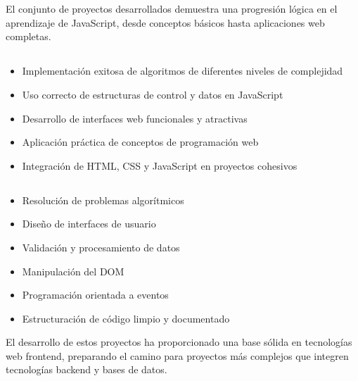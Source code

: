 \documentclass[10pt,a4paper]{article}
\begin{document}
\pagebreak

\section{\color{colorIPN}{Conclusiones Generales}}
El conjunto de proyectos desarrollados demuestra una progresión lógica en el aprendizaje de JavaScript, desde conceptos básicos hasta aplicaciones web completas.

\subsection{\color{colorESCOM}{Logros Alcanzados}}
\begin{itemize}
	\item Implementación exitosa de algoritmos de diferentes niveles de complejidad
	\item Uso correcto de estructuras de control y datos en JavaScript
	\item Desarrollo de interfaces web funcionales y atractivas
	\item Aplicación práctica de conceptos de programación web
	\item Integración de HTML, CSS y JavaScript en proyectos cohesivos
\end{itemize}

\subsection{\color{colorESCOM}{Habilidades Desarrolladas}}
\begin{itemize}
	\item Resolución de problemas algorítmicos
	\item Diseño de interfaces de usuario
	\item Validación y procesamiento de datos
	\item Manipulación del DOM
	\item Programación orientada a eventos
	\item Estructuración de código limpio y documentado
\end{itemize}

El desarrollo de estos proyectos ha proporcionado una base sólida en tecnologías web frontend, preparando el camino para proyectos más complejos que integren tecnologías backend y bases de datos.

\end{document}
